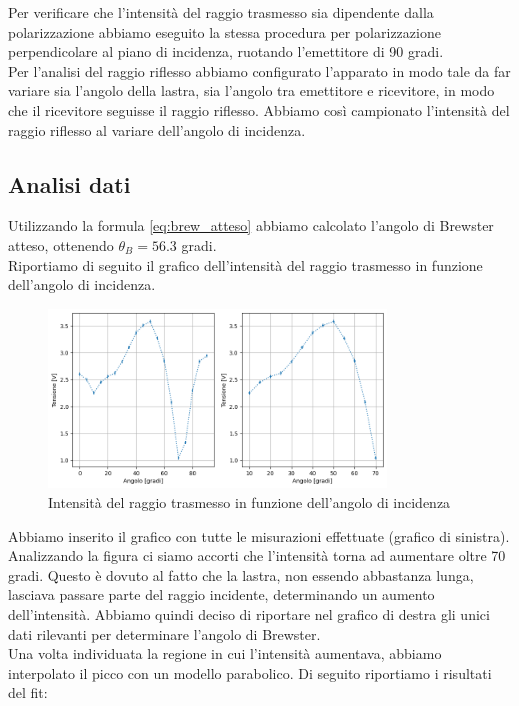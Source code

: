 \documentclass[letterpaper,12pt]{article}
\begin{document}
Per verificare che l'intensità del raggio trasmesso sia dipendente dalla polarizzazione abbiamo
eseguito la stessa procedura per polarizzazione perpendicolare al piano di incidenza,
ruotando l'emettitore di 90 gradi. \\

Per l'analisi del raggio riflesso abbiamo configurato l'apparato in modo tale da far variare sia l'angolo della 
lastra, sia l'angolo tra emettitore e ricevitore, in modo che il ricevitore seguisse il raggio riflesso. Abbiamo 
così campionato l'intensità del raggio riflesso al variare dell'angolo di incidenza.\\

\subsection{Analisi dati}

Utilizzando la formula \ref{eq:brew_atteso} abbiamo calcolato l'angolo di Brewster atteso, 
ottenendo $\theta_B = 56.3$ gradi.\\

Riportiamo di seguito il grafico dell'intensità del raggio trasmesso in funzione dell'angolo di incidenza.\\
\begin{figure}[h!]
	\centering
	\includegraphics[width = 0.8\textwidth]{trasmesso.png}
	\caption{Intensità del raggio trasmesso in funzione dell'angolo di incidenza}
	\label{fig:trasmesso}
\end{figure}

Abbiamo inserito il grafico con tutte le misurazioni effettuate (grafico di sinistra). Analizzando la figura ci
siamo accorti che l'intensità torna ad aumentare oltre 70 gradi. Questo è dovuto al fatto che la lastra, non 
essendo abbastanza lunga, lasciava passare parte del raggio incidente, determinando un aumento dell'intensità. 
Abbiamo quindi deciso di riportare nel grafico di destra gli unici dati rilevanti per determinare l'angolo di Brewster.\\
Una volta individuata la regione in cui l'intensità aumentava, abbiamo interpolato il picco con un modello parabolico.
Di seguito riportiamo i risultati del fit: 
\end{document}
